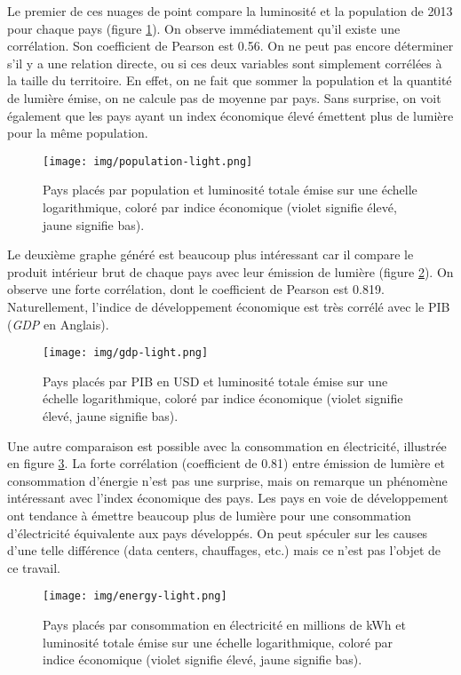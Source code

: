 \documentclass[a4paper, 11pt]{report}
\begin{document}
Le premier de ces nuages de point compare la luminosité et la population de 2013 pour chaque pays (figure \ref{country_lightpop_scatter}). On observe immédiatement qu'il existe une corrélation. Son coefficient de Pearson est 0.56. On ne peut pas encore déterminer s'il y a une relation directe, ou si ces deux variables sont simplement corrélées à la taille du territoire. En effet, on ne fait que sommer la population et la quantité de lumière émise, on ne calcule pas de moyenne par pays.
Sans surprise, on voit également que les pays ayant un index économique élevé émettent plus de lumière pour la même population.

\begin{figure}[h]
	\centering
	\texttt{[image: img/population-light.png]}
	\caption{Pays placés par population et luminosité totale émise sur une échelle logarithmique, coloré par indice économique (violet signifie élevé, jaune signifie bas).}
	\label{country_lightpop_scatter}
\end{figure}

Le deuxième graphe généré est beaucoup plus intéressant car il compare le produit intérieur brut de chaque pays avec leur émission de lumière (figure \ref{country_gdppop_scatter}). On observe une forte corrélation, dont le coefficient de Pearson est 0.819.
Naturellement, l'indice de développement économique est très corrélé avec le PIB (\textit{GDP} en Anglais).

\begin{figure}[h]
	\centering
	\texttt{[image: img/gdp-light.png]}
	\caption{Pays placés par PIB en USD et luminosité totale émise sur une échelle logarithmique, coloré par indice économique (violet signifie élevé, jaune signifie bas).}
	\label{country_gdppop_scatter}
\end{figure}

Une autre comparaison est possible avec la consommation en électricité, illustrée en figure \ref{country_energypop_scatter}. La forte corrélation (coefficient de 0.81) entre émission de lumière et consommation d'énergie n'est pas une surprise, mais on remarque un phénomène intéressant avec l'index économique des pays. Les pays en voie de développement ont tendance à émettre beaucoup plus de lumière pour une consommation d'électricité équivalente aux pays développés. On peut spéculer sur les causes d'une telle différence (data centers, chauffages, etc.) mais ce n'est pas l'objet de ce travail.

\begin{figure}[h]
	\centering
	\texttt{[image: img/energy-light.png]}
	\caption{Pays placés par consommation en électricité en millions de kWh et luminosité totale émise sur une échelle logarithmique, coloré par indice économique (violet signifie élevé, jaune signifie bas).}
	\label{country_energypop_scatter}
\end{figure}
\end{document}
